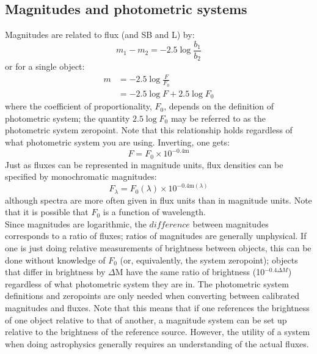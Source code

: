 \documentclass[12pt]{article}
\begin{document}
\subsection*{Magnitudes and photometric systems}
Magnitudes are related to flux (and SB and L) by:
\begin{equation*}
    m_1 - m_2 = -2.5 \log \frac{b_1}{b_2}
\end{equation*}
or for a single object:
\begin{align*}
    m &= -2.5 \log \frac{F}{F_0}\\
      &= -2.5 \log F + 2.5 \log F_0
\end{align*}
where the coefficient of proportionality, $F_0$, depends on the definition
of photometric system; the quantity $2.5 \log F_0$ may be referred to as
the photometric system zeropoint. Note that this relationship holds
regardless of what photometric system you are using. Inverting, one gets:
\begin{equation*}
    F = F_0 \times 10^{-0.4\textrm{m}}
\end{equation*}
Just as fluxes can be represented in magnitude units, flux densities can be
specified by monochromatic magnitudes:
\begin{equation*}
    F_{\lambda} = F_0 (\lambda) \times 10^{-0.4 \textrm{m}(\lambda)}
\end{equation*}
although spectra are more often given in flux units than in magnitude units.
Note that it is possible that $F_0$ is a function of wavelength.\\

\noindent Since magnitudes are logarithmic, the $difference$ between
magnitudes corresponds to a ratio of fluxes; ratios of magnitudes are
generally unphysical. If one is just doing relative measurements of
brightness between objects, this can be done without knowledge of $F_0$
(or, equivalently, the system zeropoint); objects that differ in brightness
by $\Delta$M have the same ratio of brightness (10$^{-0.4 \Delta M}$)
regardless of what photometric system they are in. The photometric system
definitions and zeropoints are only needed when converting between calibrated
magnitudes and fluxes. Note that this means that if one references the
brightness of one object relative to that of another, a magnitude system
can be set up relative to the brightness of the reference source. However, the
utility of a system when doing astrophysics generally requires an
understanding of the actual fluxes.\\
\end{document}
